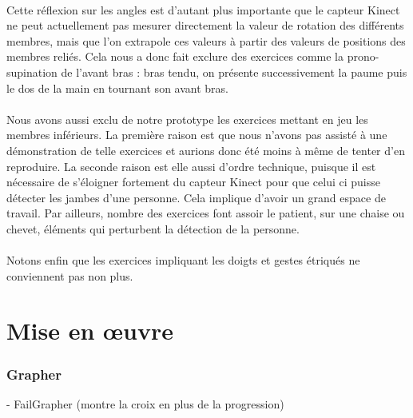 \documentclass[french,12pt]{report}
\begin{document}
\paragraph{}
Cette réflexion sur les angles est d'autant plus importante que le capteur Kinect ne peut actuellement pas mesurer directement
la valeur de rotation des différents membres, mais que l'on extrapole ces valeurs à partir des valeurs de positions des membres
reliés. Cela nous a donc fait exclure des exercices comme la prono-supination de l'avant bras : bras tendu, on présente successivement la paume puis le dos de la main en tournant son avant bras.

\paragraph{}
Nous avons aussi exclu de notre prototype les exercices mettant en jeu les membres inférieurs. La première raison est que nous n'avons pas assisté à une démonstration de telle exercices et aurions donc été moins à même de tenter d'en reproduire. La 
seconde raison est elle aussi d'ordre technique, puisque il est nécessaire de s'éloigner fortement du capteur Kinect pour que 
celui ci puisse détecter les jambes d'une personne. Cela implique d'avoir un grand espace de travail. Par ailleurs, nombre 
des exercices font assoir le patient, sur une chaise ou chevet, éléments qui perturbent la détection de la personne.

\paragraph{}
Notons enfin que les exercices impliquant les doigts et gestes étriqués ne conviennent pas non plus.

		\section{Mise en œuvre} 	%

		\subsubsection{Grapher}
		- FailGrapher (montre la croix en plus de la progression)
		
\end{document}
